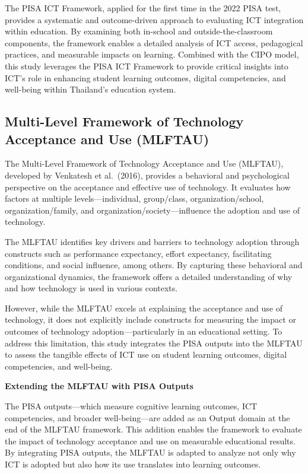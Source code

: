 \documentclass[
]{article}
\begin{document}
The PISA ICT Framework, applied for the first time in the 2022 PISA
test, provides a systematic and outcome-driven approach to evaluating
ICT integration within education. By examining both in-school and
outside-the-classroom components, the framework enables a detailed
analysis of ICT access, pedagogical practices, and measurable impacts on
learning. Combined with the CIPO model, this study leverages the PISA
ICT Framework to provide critical insights into ICT's role in enhancing
student learning outcomes, digital competencies, and well-being within
Thailand's education system.

\hypertarget{multi-level-framework-of-technology-acceptance-and-use-mlftau}{%
\subsection{Multi-Level Framework of Technology Acceptance and Use
(MLFTAU)}\label{multi-level-framework-of-technology-acceptance-and-use-mlftau}}

The Multi-Level Framework of Technology Acceptance and Use (MLFTAU),
developed by Venkatesh et al.~(2016), provides a behavioral and
psychological perspective on the acceptance and effective use of
technology. It evaluates how factors at multiple levels---individual,
group/class, organization/school, organization/family, and
organization/society---influence the adoption and use of technology.

The MLFTAU identifies key drivers and barriers to technology adoption
through constructs such as performance expectancy, effort expectancy,
facilitating conditions, and social influence, among others. By
capturing these behavioral and organizational dynamics, the framework
offers a detailed understanding of why and how technology is used in
various contexts.

However, while the MLFTAU excels at explaining the acceptance and use of
technology, it does not explicitly include constructs for measuring the
impact or outcomes of technology adoption---particularly in an
educational setting. To address this limitation, this study integrates
the PISA outputs into the MLFTAU to assess the tangible effects of ICT
use on student learning outcomes, digital competencies, and well-being.

\textbf{Extending the MLFTAU with PISA Outputs}

The PISA outputs---which measure cognitive learning outcomes, ICT
competencies, and broader well-being---are added as an Output domain at
the end of the MLFTAU framework. This addition enables the framework to
evaluate the impact of technology acceptance and use on measurable
educational results. By integrating PISA outputs, the MLFTAU is adapted
to analyze not only why ICT is adopted but also how its use translates
into learning outcomes.
\end{document}
